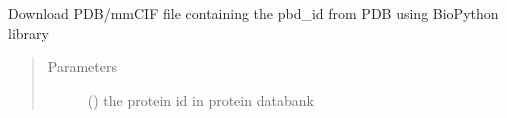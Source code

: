 \documentclass[letterpaper,10pt,english]{sphinxmanual}
\begin{document}
\begin{fulllineitems}
\label{\detokenize{IPTK.Analysis:IPTK.Analysis.AnalysisFunction.download_structure_file}}
Download PDB/mmCIF file containing the pbd\_id from PDB using BioPython library
\begin{quote}\begin{description}
\item[{Parameters}] \leavevmode
{} () \textendash{} the protein id in protein databank

\end{description}\end{quote}

\end{fulllineitems}

\end{document}
